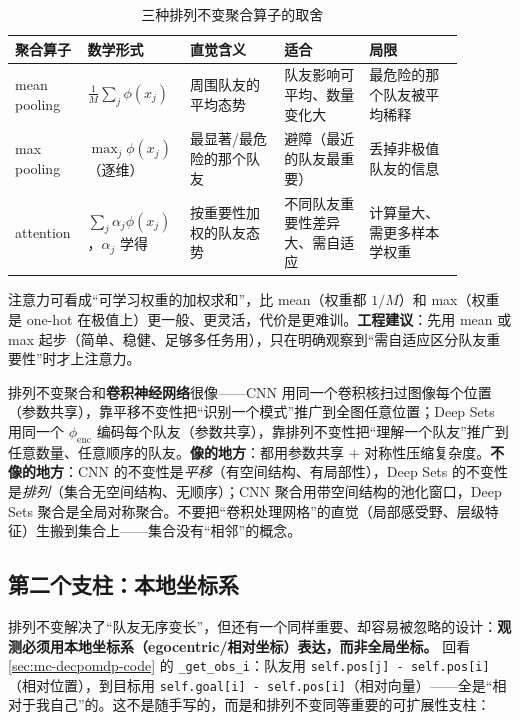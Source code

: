\begin{table}[H]\centering\small
\caption{三种排列不变聚合算子的取舍}
\label{tab:mc-agg}
\begin{tabular}{p{0.13\linewidth}p{0.18\linewidth}p{0.20\linewidth}p{0.18\linewidth}p{0.20\linewidth}}
\toprule
聚合算子 & 数学形式 & 直觉含义 & 适合 & 局限 \\
\midrule
mean pooling & $\frac1M\sum_j\phi(x_j)$ & 周围队友的平均态势 & 队友影响可平均、数量变化大 & 最危险的那个队友被平均稀释 \\
max pooling & $\max_j\phi(x_j)$（逐维） & 最显著/最危险的那个队友 & 避障（最近的队友最重要） & 丢掉非极值队友的信息 \\
attention & $\sum_j\alpha_j\phi(x_j)$，$\alpha_j$ 学得 & 按重要性加权的队友态势 & 不同队友重要性差异大、需自适应 & 计算量大、需更多样本学权重 \\
\bottomrule
\end{tabular}
\end{table}

\noindent 注意力可看成“可学习权重的加权求和”，比 mean（权重都 $1/M$）和 max（权重是 one-hot 在极值上）更一般、更灵活，代价是更难训。\textbf{工程建议}：先用 mean 或 max 起步（简单、稳健、足够多任务用），只在明确观察到“需自适应区分队友重要性”时才上注意力。

\begin{insight}
排列不变聚合和\textbf{卷积神经网络}很像——CNN 用同一个卷积核扫过图像每个位置（参数共享），靠平移不变性把“识别一个模式”推广到全图任意位置；Deep Sets 用同一个 $\phi_{\mathrm{enc}}$ 编码每个队友（参数共享），靠排列不变性把“理解一个队友”推广到任意数量、任意顺序的队友。\textbf{像的地方}：都用参数共享 $+$ 对称性压缩复杂度。\textbf{不像的地方}：CNN 的不变性是\emph{平移}（有空间结构、有局部性），Deep Sets 的不变性是\emph{排列}（集合无空间结构、无顺序）；CNN 聚合用带空间结构的池化窗口，Deep Sets 聚合是全局对称聚合。不要把“卷积处理网格”的直觉（局部感受野、层级特征）生搬到集合上——集合没有“相邻”的概念。
\end{insight}

\subsection{第二个支柱：本地坐标系}
\label{sec:mc-egocentric}

排列不变解决了“队友无序变长”，但还有一个同样重要、却容易被忽略的设计：\textbf{观测必须用本地坐标系（egocentric/相对坐标）表达，而非全局坐标。} 回看 \cref{sec:mc-decpomdp-code} 的 \verb|_get_obs_i|：队友用 \verb|self.pos[j] - self.pos[i]|（相对位置），到目标用 \verb|self.goal[i] - self.pos[i]|（相对向量）——全是“相对于我自己”的。这不是随手写的，而是和排列不变同等重要的可扩展性支柱：


